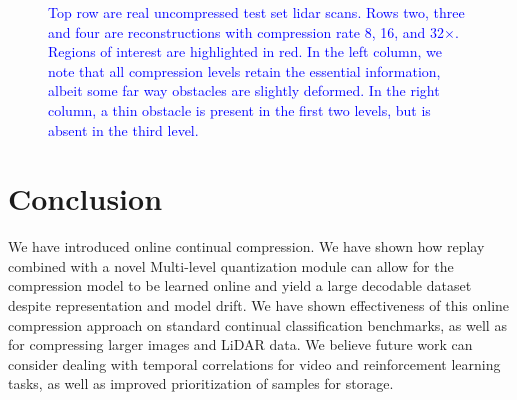 \documentclass[colorinlistoftodos]{article} %
\newcommand\mynotesLC[1]{\textcolor{blue}{#1}}
\begin{document}
\begin{figure}
\caption{\mynotesLC{Top row are real uncompressed test set lidar scans. Rows two, three and four are reconstructions with compression rate 8, 16, and 32$\times$. Regions of interest are highlighted in red. In the left column, we note that all compression levels retain the essential information, albeit some far way obstacles are slightly deformed. In the right column, a thin obstacle is present in the first two levels, but is absent in the third level.}}
\label{fig:lidar_qualitative}
\end{figure}




\section{Conclusion}
We have introduced online continual compression. We have shown how replay combined with a novel Multi-level quantization module can allow for the compression model to be learned online and yield a large decodable dataset despite representation and model drift. We have shown effectiveness of this online compression approach on standard continual classification benchmarks, as well as for compressing larger images and LiDAR data. We believe future work can consider dealing with temporal correlations for video and reinforcement learning tasks, as well as improved prioritization of samples for storage.  



\end{document}
